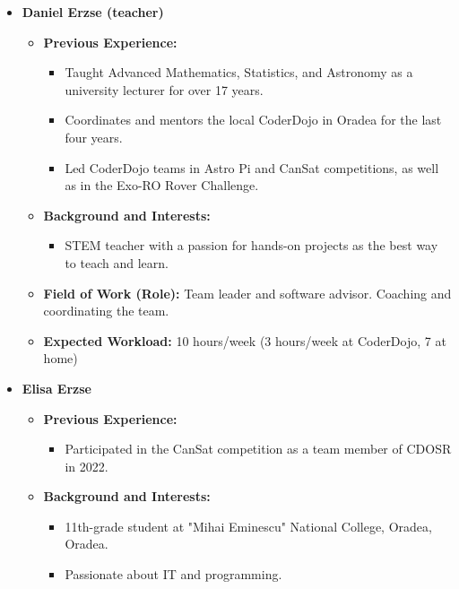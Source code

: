 \documentclass[11pt]{article}
\begin{document}
\begin{itemize}
    \item[] \textbf{Daniel Erzse (teacher)}
    \begin{itemize}[label=]
        \item[\faCogs] \textbf{Previous Experience:} 
        \begin{itemize}[label=]
            \item Taught Advanced Mathematics, Statistics, and Astronomy as a university lecturer for over 17 years.
            \item Coordinates and mentors the local CoderDojo in Oradea for the last four years.
            \item Led CoderDojo teams in Astro Pi and CanSat competitions, as well as in the Exo-RO Rover Challenge.
        \end{itemize}
        \item[\faGraduationCap] \textbf{Background and Interests:} 
        \begin{itemize}[label=]
            \item STEM teacher with a passion for hands-on projects as the best way to teach and learn.
        \end{itemize}
        \item[\faMicroscope] \textbf{Field of Work (Role):} Team leader and software advisor. Coaching and coordinating the team.
        \item[\faLaptopCode] \textbf{Expected Workload:} 10 hours/week (3 hours/week at CoderDojo, 7 at home)
    \end{itemize}
    \vspace{0.2 cm}
    \item[] \textbf{Elisa Erzse}
    \begin{itemize}[label=]
        \item[\faCogs] \textbf{Previous Experience:} 
        \begin{itemize}[label=]
            \item Participated in the CanSat competition as a team member of CDOSR in 2022.
        \end{itemize}
        \item[\faGraduationCap] \textbf{Background and Interests:} 
        \begin{itemize}[label=]
            \item 11th-grade student at "Mihai Eminescu" National College, Oradea, Oradea.
            \item Passionate about IT and programming.

\end{itemize}
\end{itemize}
\end{itemize}
\end{document}
